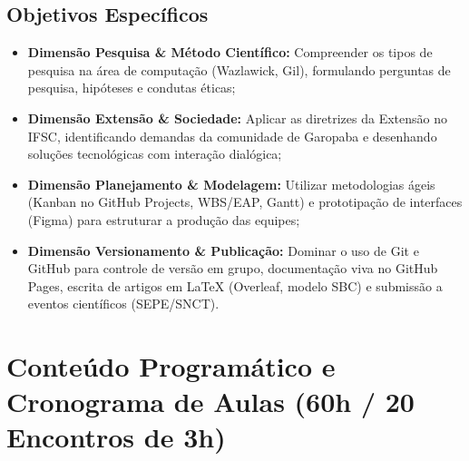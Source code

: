 \documentclass[12pt,a4paper]{article}
\begin{document}
\subsection{Objetivos Específicos}
\begin{itemize}[leftmargin=*]
    \item \textbf{Dimensão Pesquisa \& Método Científico:} Compreender os tipos de pesquisa na área de computação (Wazlawick, Gil), formulando perguntas de pesquisa, hipóteses e condutas éticas;
    \item \textbf{Dimensão Extensão \& Sociedade:} Aplicar as diretrizes da Extensão no IFSC, identificando demandas da comunidade de Garopaba e desenhando soluções tecnológicas com interação dialógica;
    \item \textbf{Dimensão Planejamento \& Modelagem:} Utilizar metodologias ágeis (Kanban no GitHub Projects, WBS/EAP, Gantt) e prototipação de interfaces (Figma) para estruturar a produção das equipes;
    \item \textbf{Dimensão Versionamento \& Publicação:} Dominar o uso de Git e GitHub para controle de versão em grupo, documentação viva no GitHub Pages, escrita de artigos em LaTeX (Overleaf, modelo SBC) e submissão a eventos científicos (SEPE/SNCT).
\end{itemize}

\section{Conteúdo Programático e Cronograma de Aulas (60h / 20 Encontros de 3h)}
\end{document}
